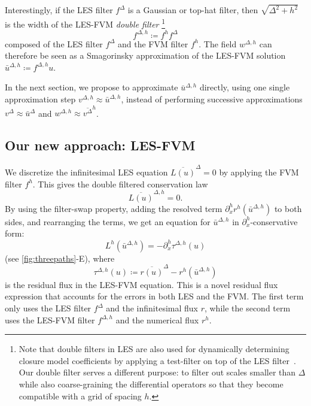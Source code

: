 \documentclass[preprint,twocolumn,5p]{elsarticle}
\begin{document}
Interestingly,
if the LES filter $f^\Delta$
is a Gaussian or top-hat filter,
then $\sqrt{\Delta^2 + h^2}$
is the width of the LES-FVM \emph{double filter}
\footnote{
    Note that double filters in LES are also used for dynamically determining
    closure model coefficients by applying a test-filter on top
    of the LES filter~\cite{germanoDynamicSubgridscaleEddy1991}.
    Our double filter serves a different purpose:
    to filter out scales smaller than $\Delta$
    while also coarse-graining the differential operators
    so that they become compatible with a grid of spacing $h$.
}
\begin{equation}
    f^{\Delta, h} \coloneq f^h f^\Delta
\end{equation}
composed of the LES filter $f^\Delta$ and the FVM filter $f^h$.
The field $w^{\Delta, h}$ can therefore be seen as a
Smagorinsky approximation of the LES-FVM solution
$\bar{u}^{\Delta, h} \coloneq f^{\Delta, h} u$.

In the next section,
we propose to approximate $\bar{u}^{\Delta, h}$ directly, using one
single approximation step $v^{\Delta, h} \approx \bar{u}^{\Delta, h}$,
instead of performing successive approximations
$v^\Delta \approx \bar{u}^\Delta$ and
$w^{\Delta, h} \approx \overline{v^\Delta}^h$.

\subsection{Our new approach: LES-FVM}
\label{sec:les-fvm-discretize-first}

We discretize the infinitesimal LES equation
$\overline{L(u)}^\Delta = 0$ by applying the FVM filter $f^h$.
This gives the double filtered conservation law
\begin{equation}
    \overline{L(u)}^{\Delta, h} = 0.
\end{equation}
By using the filter-swap property,
adding the resolved term $\partial^h_x r^h(\bar{u}^{\Delta, h})$ to both
sides, and rearranging the terms,
we get an equation for $\bar{u}^{\Delta, h}$ in
$\partial^h_x$-conservative form:
\begin{equation} \label{eq:cl-les-fvm}
    L^h(\bar{u}^{\Delta, h}) = -\partial^h_x \tau^{\Delta, h}(u)
\end{equation}
(see \cref{fig:threepaths}-E), where
\begin{equation} \label{eq:cl-tau-Delta-h}
    \boxed{\tau^{\Delta, h}(u) \coloneq \overline{r(u)}^\Delta - r^h(\bar{u}^{\Delta, h})}
\end{equation}
is the residual flux in the LES-FVM equation.
This is a novel residual flux expression that accounts for the errors in both
LES and the FVM. The first term only uses the LES filter $f^\Delta$ and the
infinitesimal flux $r$, while the second term uses the LES-FVM filter
$f^{\Delta, h}$ and the numerical flux $r^h$.
\end{document}
